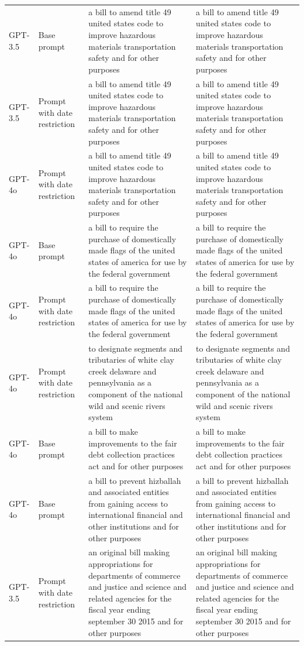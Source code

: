 \begin{longtable}{>{\raggedright\arraybackslash}p{1.4cm}>{\raggedright\arraybackslash}p{1.4cm}>{\raggedright\arraybackslash}p{5.5cm}>{\raggedright\arraybackslash}p{5.5cm}}
GPT-3.5 & Base prompt & a bill to amend title 49 united states code to improve hazardous materials transportation safety and for other purposes & a bill to amend title 49 united states code to improve hazardous materials transportation safety and for other purposes\\
GPT-3.5 & Prompt with date restriction & a bill to amend title 49 united states code to improve hazardous materials transportation safety and for other purposes & a bill to amend title 49 united states code to improve hazardous materials transportation safety and for other purposes\\
GPT-4o & Prompt with date restriction & a bill to amend title 49 united states code to improve hazardous materials transportation safety and for other purposes & a bill to amend title 49 united states code to improve hazardous materials transportation safety and for other purposes\\
GPT-4o & Base prompt & a bill to require the purchase of domestically made flags of the united states of america for use by the federal government & a bill to require the purchase of domestically made flags of the united states of america for use by the federal government\\
GPT-4o & Prompt with date restriction & a bill to require the purchase of domestically made flags of the united states of america for use by the federal government & a bill to require the purchase of domestically made flags of the united states of america for use by the federal government\\
GPT-4o & Prompt with date restriction & to designate segments and tributaries of white clay creek delaware and pennsylvania as a component of the national wild and scenic rivers system & to designate segments and tributaries of white clay creek delaware and pennsylvania as a component of the national wild and scenic rivers system\\
GPT-4o & Base prompt & a bill to make improvements to the fair debt collection practices act and for other purposes & a bill to make improvements to the fair debt collection practices act and for other purposes\\
GPT-4o & Base prompt & a bill to prevent hizballah and associated entities from gaining access to international financial and other institutions and for other purposes & a bill to prevent hizballah and associated entities from gaining access to international financial and other institutions and for other purposes\\
GPT-3.5 & Prompt with date restriction & an original bill making appropriations for departments of commerce and justice and science and related agencies for the fiscal year ending september 30 2015 and for other purposes & an original bill making appropriations for departments of commerce and justice and science and related agencies for the fiscal year ending september 30 2015 and for other purposes\\

\end{longtable}
